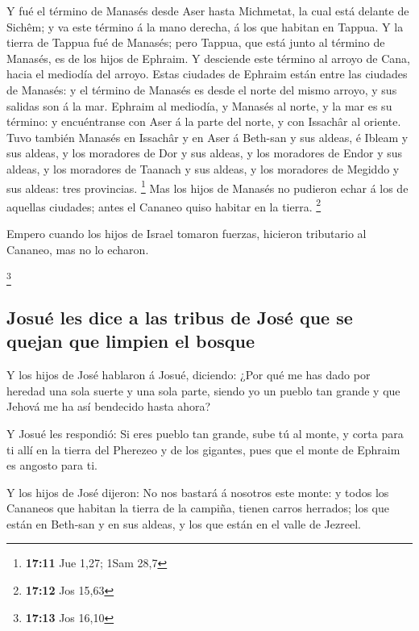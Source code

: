  Y fué el término de Manasés desde Aser hasta Michmetat, la
cual está delante de Sichêm; y va este término á la mano derecha, á los
que habitan en Tappua.  Y la tierra de Tappua fué de
Manasés; pero Tappua, que está junto al término de Manasés, es de los
hijos de Ephraim.  Y desciende este término al arroyo de
Cana, hacia el mediodía del arroyo. Estas ciudades de Ephraim están
entre las ciudades de Manasés: y el término de Manasés es desde el norte
del mismo arroyo, y sus salidas son á la mar.  Ephraim al
mediodía, y Manasés al norte, y la mar es su término: y encuéntranse con
Aser á la parte del norte, y con Issachâr al oriente.  Tuvo
también Manasés en Issachâr y en Aser á Beth-san y sus aldeas, é Ibleam
y sus aldeas, y los moradores de Dor y sus aldeas, y los moradores de
Endor y sus aldeas, y los moradores de Taanach y sus aldeas, y los
moradores de Megiddo y sus aldeas: tres provincias. \footnote{\textbf{17:11}
  Jue 1,27; 1Sam 28,7}  Mas los hijos de Manasés no
pudieron echar á los de aquellas ciudades; antes el Cananeo quiso
habitar en la tierra. \footnote{\textbf{17:12} Jos 15,63}

 Empero cuando los hijos de Israel tomaron fuerzas,
hicieron tributario al Cananeo, mas no lo echaron.

\footnote{\textbf{17:13} Jos 16,10}

\hypertarget{josuuxe9-les-dice-a-las-tribus-de-josuxe9-que-se-quejan-que-limpien-el-bosque}{%
\subsection{Josué les dice a las tribus de José que se quejan que
limpien el
bosque}\label{josuuxe9-les-dice-a-las-tribus-de-josuxe9-que-se-quejan-que-limpien-el-bosque}}

 Y los hijos de José hablaron á Josué, diciendo: ¿Por qué
me has dado por heredad una sola suerte y una sola parte, siendo yo un
pueblo tan grande y que Jehová me ha así bendecido hasta ahora?

 Y Josué les respondió: Si eres pueblo tan grande, sube tú
al monte, y corta para ti allí en la tierra del Pherezeo y de los
gigantes, pues que el monte de Ephraim es angosto para ti.

 Y los hijos de José dijeron: No nos bastará á nosotros
este monte: y todos los Cananeos que habitan la tierra de la campiña,
tienen carros herrados; los que están en Beth-san y en sus aldeas, y los
que están en el valle de Jezreel.


